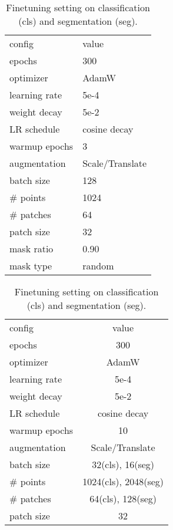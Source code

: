 \documentclass[runningheads]{llncs}
\begin{document}
\begin{table}[t!]
\tabcolsep=0.2cm

\parbox{.45\linewidth}{
    \begin{tabular}{l|l}
        config & value\\
        \shline
        epochs & 300 \\
        optimizer & AdamW \\
        learning rate & 5e-4 \\
        weight decay & 5e-2 \\
        LR schedule & cosine decay \\
        warmup epochs & 3 \\
        augmentation & Scale/Translate \\
        batch size & 128 \\
        \# points & 1024 \\
        \# patches & 64 \\
        patch size & 32 \\
        mask ratio & 0.90 \\
        mask type & random \\
    \end{tabular}
    \vspace{3pt}
    \caption{Pretraining setting on ShapeNet~\cite{chang2015shapenet}.}
    \label{tab:pretrain_shapenet}
}
\hspace{.05\linewidth}
\parbox{.45\linewidth}{
    \centering
    \begin{tabular}[t]{l|c}
        config & value \\
        \shline
        epochs & 300 \\
        optimizer & AdamW \\
        learning rate & 5e-4 \\
        weight decay & 5e-2 \\
        LR schedule & cosine decay \\
        warmup epochs & 10 \\
        augmentation & Scale/Translate \\
        batch size & 32(cls), 16(seg) \\
        \# points & 1024(cls), 2048(seg) \\
        \# patches & 64(cls), 128(seg) \\
        patch size & 32 \\
    \end{tabular}
    \vspace{3pt}
    \caption{Finetuning setting on classification (cls) and segmentation (seg).}
    \label{tab:finetuning}
}
\vspace{-20pt}
\end{table}
\end{document}
